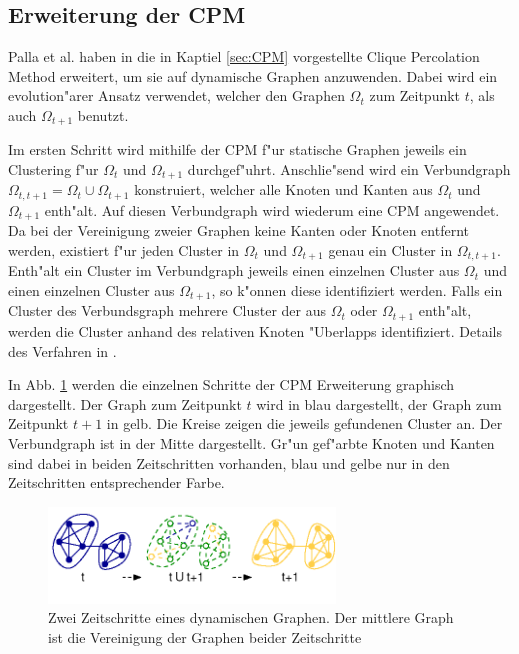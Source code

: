 \documentclass[journal]{vgtc}
\begin{document}
  \subsection{Erweiterung der CPM}
    \label{sec:CPM_time}
    Palla et al. haben in \cite{CPM_time} die in Kaptiel \ref{sec:CPM} vorgestellte Clique Percolation Method erweitert, um sie auf dynamische
    Graphen anzuwenden. Dabei wird ein evolution"arer Ansatz verwendet, welcher den Graphen $\Omega_{t}$ zum Zeitpunkt $t$, als auch $\Omega_{t+1}$
    benutzt.
    
    Im ersten Schritt wird mithilfe der CPM f"ur statische Graphen jeweils ein Clustering f"ur $\Omega_{t}$ und $\Omega_{t+1}$ durchgef"uhrt.
    Anschlie"send wird ein Verbundgraph $\Omega_{t,t+1} = \Omega_{t} \cup \Omega_{t+1}$ konstruiert, welcher alle Knoten und Kanten aus
    $\Omega_t$ und $\Omega_{t+1}$ enth"alt. Auf diesen Verbundgraph wird wiederum eine CPM angewendet. Da bei der Vereinigung zweier Graphen
    keine Kanten oder Knoten entfernt werden, existiert f"ur jeden Cluster in $\Omega_t$ und $\Omega_{t+1}$ genau ein Cluster in $\Omega_{t,t+1}$.
    Enth"alt ein Cluster im Verbundgraph jeweils einen einzelnen Cluster aus $\Omega_t$ und einen einzelnen Cluster aus $\Omega_{t+1}$,
    so k"onnen diese identifiziert werden. Falls ein Cluster des Verbundsgraph mehrere Cluster der aus $\Omega_t$ oder $\Omega_{t+1}$
    enth"alt, werden die Cluster anhand des relativen Knoten "Uberlapps identifiziert. Details des Verfahren in \cite{CPM_time}.
    
    In Abb. \ref{fig:CPM_time} werden die einzelnen Schritte der CPM Erweiterung graphisch dargestellt. Der Graph zum Zeitpunkt $t$ wird
    in blau dargestellt, der Graph zum Zeitpunkt $t+1$ in gelb. Die Kreise zeigen die jeweils gefundenen Cluster an. Der Verbundgraph ist
    in der Mitte dargestellt. Gr"un gef"arbte Knoten und Kanten sind dabei in beiden Zeitschritten vorhanden, blau und gelbe nur in den
    Zeitschritten entsprechender Farbe.
    
    \begin{figure}[h]
      \centering
      \includegraphics[width=3in]{images/CPM_time}
      \caption{\label{fig:CPM_time} Zwei Zeitschritte eines dynamischen Graphen. Der mittlere Graph ist die Vereinigung der Graphen beider Zeitschritte \cite{CPM_time}}
    \end{figure}
\end{document}
